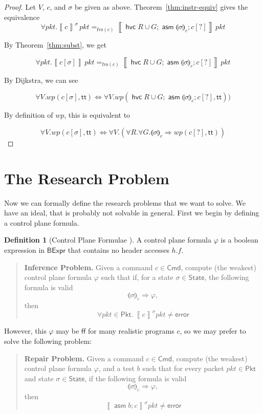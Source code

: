 \documentclass{article}
\newcommand{\pkt}{\mathit{pkt}}
\newcommand{\error}{\mathsf{error}}
\newcommand{\denote}[1]{\left\llbracket#1\right\rrbracket}
\newcommand{\TRUE}{\mathsf{tt}}
\newcommand{\FALSE}{\mathsf{ff}}
\newcommand{\BExpr}{\mathsf{BExpr}}
\newcommand{\Cmd}{\mathsf{Cmd}}
\newcommand{\Pkt}{\mathsf{Pkt}}
\newcommand{\State}{\mathsf{State}}
\newcommand{\assume}{\mathop{\mathsf{asm}}}
\newcommand{\havoc}[1]{\mathop{\mathsf{hvc}}#1}
\newcommand{\WP}{\textit{wp}}
\newcommand{\state}[1]{\llparenthesis#1\rrparenthesis}
\newcommand{\instr}{[?]}
\newcommand{\fvs}{\textrm{fvs}}
\theoremstyle{plain}
\theoremstyle{definition}
\newtheorem{definition}{Definition}
\theoremstyle{remark}
\begin{document}
\begin{proof}
  Let $V$, $c$, and $\sigma$ be given as above.
  Theorem~\ref{thm:instr-equiv} gives the equivalence
  \[\forall \pkt. \denote{c}^\sigma\,\pkt =_{\fvs(c)} \denote{\havoc{R \cup G}; \assume{\state\sigma_c}; c\instr}\,\pkt\]

  By Theorem~\ref{thm:subst}, we get

  \[\forall \pkt.\denote{c[\sigma]}\,\pkt =_{\fvs(c)}  \denote{\havoc{R \cup G}; \assume{\state\sigma_c}; c\instr}\,\pkt\]

  By Dijkstra, we can see

  \[\forall V. \WP(c[\sigma], \TRUE) \iff \forall V. \WP(\havoc{R \cup G}; \assume{\state\sigma_c}; c\instr, \TRUE))\]

  By definition of $\WP$, this is equivalent to

  \[ \forall V. \WP(c[\sigma],\TRUE) \iff \forall V. \left(\forall R.\forall G.\state\sigma_c \Rightarrow \WP(c\instr, \TRUE)\right)\]

\end{proof}


\clearpage
\section{The Research Problem}

Now we can formally define the research problems that we want to solve. We have
an ideal, that is probably not solvable in general. First we begin by defining a control plane formula.

\begin{definition}[Control Plane Formulae ]
  A control plane formula $\varphi$ is a boolean expression in $\BExpr$ that
  contains no header accesses $h.f$.
\end{definition}

\begin{quote}
  \textbf{Inference Problem.} Given a command $c \in \Cmd$, compute (the
  weakest) control plane formula $\varphi$ such that if, for a state $\sigma \in \State$, the following formula is valid \[\state\sigma_c
  \Rightarrow \varphi,\] then \[\forall \pkt \in \Pkt.~ \denote{c}^\sigma\pkt \neq \error \]
\end{quote}

However, this $\varphi$ may be $\FALSE$ for many realistic programs $c$, so we may
prefer to solve the following problem:

\begin{quote}
  \textbf{Repair Problem.} Given a command $c \in \Cmd$, compute (the weakest)
  control plane formula $\varphi$, and a test $b$ such that for every
  packet $\pkt \in \Pkt$ and state $\sigma  \in \State$, if the
  following formula is valid
  \[\state\sigma_c \Rightarrow \varphi,\]
  then \[\denote{\assume b; c}^\sigma\pkt \neq \error \]
\end{quote}
\end{document}
